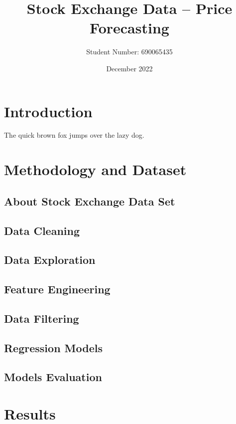 \documentclass[a4paper, 11pt]{article}
\begin{document}
\title{Stock Exchange Data -- Price Forecasting}
\author{Student Number: 690065435}
\date{December 2022}
\maketitle

\section{Introduction}
The quick brown fox jumps over the lazy dog.

\section{Methodology and Dataset}

\subsection{About Stock Exchange Data Set}

\subsection{Data Cleaning}

\subsection{Data Exploration}

\subsection{Feature Engineering}

\subsection{Data Filtering}

\subsection{Regression Models}

\subsection{Models Evaluation}

\section{Results}
\end{document}
